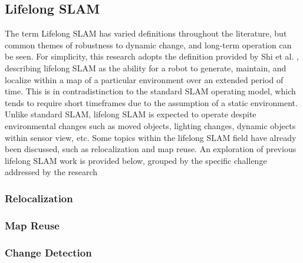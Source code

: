 \subsection{Lifelong SLAM}

The term Lifelong SLAM has varied definitions throughout the literature, but common themes of robustness to dynamic change, and long-term operation can be seen. For simplicity, this research adopts the definition provided by Shi et al. \cite{shiAreWeReady2020}, describing lifelong SLAM as the ability for a robot to generate, maintain, and localize within a map of a particular environment over an extended period of time. This is in contradistinction to the standard SLAM operating model, which tends to require short timeframes due to the assumption of a static environment. Unlike standard SLAM, lifelong SLAM is expected to operate despite environmental changes such as moved objects, lighting changes, dynamic objects within sensor view, etc. Some topics within the lifelong SLAM field have already been discussed, such as relocalization and map reuse. An exploration of previous lifelong SLAM work is provided below, grouped by the specific challenge addressed by the research

\subsubsection{Relocalization}
\subsubsection{Map Reuse}
\subsubsection{Change Detection}

